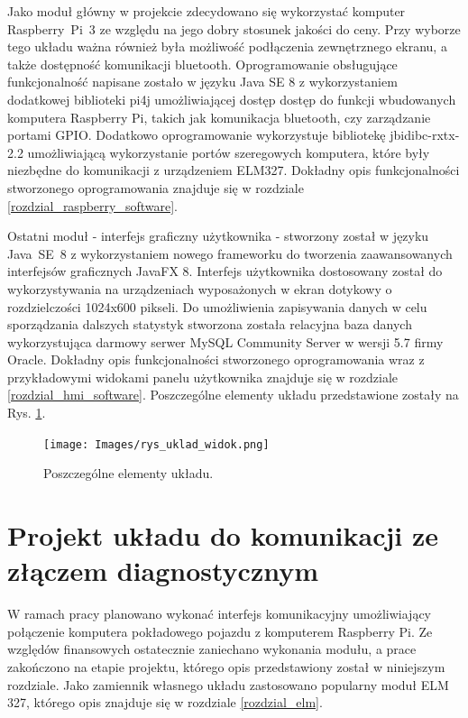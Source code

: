 \documentclass[12pt, twoside]{article} %
\numberwithin{equation}{subsection}
\numberwithin{figure}{section}
\numberwithin{table}{section}
\begin{document}
	\newpage
	
	Jako moduł główny w projekcie zdecydowano się wykorzystać komputer \mbox{Raspberry Pi 3} ze względu na jego dobry stosunek jakości do ceny. Przy wyborze tego układu ważna również była możliwość podłączenia zewnętrznego ekranu, a także dostępność komunikacji bluetooth. Oprogramowanie obsługujące funkcjonalność napisane zostało w języku Java SE 8 z wykorzystaniem dodatkowej biblioteki pi4j umożliwiającej dostęp dostęp do funkcji wbudowanych komputera Raspberry Pi, takich jak komunikacja bluetooth, czy zarządzanie portami GPIO. Dodatkowo oprogramowanie wykorzystuje bibliotekę jbidibc-rxtx-2.2 umożliwiającą wykorzystanie portów szeregowych komputera, które były niezbędne do komunikacji z urządzeniem ELM327. Dokładny opis funkcjonalności stworzonego oprogramowania znajduje się w rozdziale \ref{rozdzial_raspberry_software}.
	
	Ostatni moduł - interfejs graficzny użytkownika - stworzony został w języku \mbox{Java SE 8} z wykorzystaniem nowego frameworku do tworzenia zaawansowanych interfejsów graficznych JavaFX 8. Interfejs użytkownika dostosowany został do wykorzystywania na urządzeniach wyposażonych w ekran dotykowy o rozdzielczości 1024x600 pikseli. Do umożliwienia zapisywania danych w celu sporządzania dalszych statystyk stworzona została relacyjna baza danych wykorzystująca darmowy serwer MySQL Community Server w wersji 5.7 firmy Oracle. Dokładny opis funkcjonalności stworzonego oprogramowania wraz z przykładowymi widokami panelu użytkownika znajduje się w rozdziale \ref{rozdzial_hmi_software}. Poszczególne elementy układu przedstawione zostały na Rys. \ref{rys_uklad_widok}.
	
	\begin{figure}[!h]
		\centering
		\texttt{[image: Images/rys\_uklad\_widok.png]}
		\caption{Poszczególne elementy układu.}
		\label{rys_uklad_widok}
		\end{figure}
	
	\newpage	
	
\section{Projekt układu do komunikacji ze złączem diagnostycznym} \label{rozdzial_uklad_stm}
	
	\hspace{0.5cm}W ramach pracy planowano wykonać interfejs komunikacyjny umożliwiający połączenie komputera pokładowego pojazdu z komputerem Raspberry Pi. Ze względów finansowych ostatecznie zaniechano wykonania modułu, a prace zakończono na etapie projektu, którego opis przedstawiony został w niniejszym rozdziale. Jako zamiennik własnego układu zastosowano popularny moduł ELM 327, którego opis znajduje się w rozdziale \ref{rozdzial_elm}.
	
\end{document}
